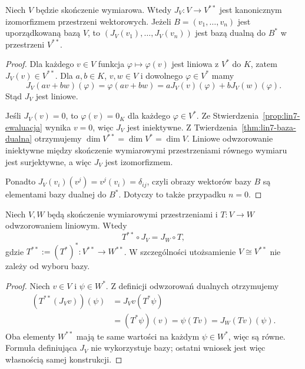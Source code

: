 \begin{twierdzenie}
\label{thm:lin7-bidualnosc}
Niech \(V\) będzie skończenie wymiarowa.
Wtedy \(J_V\colon V\to V^{**}\)
jest kanonicznym izomorfizmem
przestrzeni wektorowych.
Jeżeli \(B=(v_1,\ldots,v_n)\)
jest uporządkowaną bazą \(V\),
to \((J_V(v_1),\ldots,J_V(v_n))\)
jest bazą dualną do \(B^*\)
w przestrzeni \(V^{**}\).
\end{twierdzenie}
\begin{proof}
Dla każdego \(v\in V\)
funkcja \(\varphi\mapsto\varphi(v)\)
jest liniowa z \(V^*\) do \(K\),
zatem \(J_V(v)\in V^{**}\).
Dla \(a,b\in K\), \(v,w\in V\)
i dowolnego \(\varphi\in V^*\)
mamy
\[
 J_V(av+bw)(\varphi)
 =\varphi(av+bw)
 =aJ_V(v)(\varphi)
  +bJ_V(w)(\varphi).
\]
Stąd \(J_V\) jest liniowe.

Jeśli \(J_V(v)=0\), to
\(\varphi(v)=0_K\) dla każdego
\(\varphi\in V^*\).
Ze
Stwierdzenia~\ref{prop:lin7-ewaluacja}
wynika \(v=0\), więc \(J_V\)
jest iniektywne.
Z Twierdzenia~\ref{thm:lin7-baza-dualna}
otrzymujemy
\(\dim V^{**}=\dim V^*=\dim V\).
Liniowe odwzorowanie iniektywne
między skończenie wymiarowymi
przestrzeniami równego wymiaru
jest surjektywne, a więc \(J_V\)
jest izomorfizmem.

Ponadto
\(J_V(v_i)(v^j)=v^j(v_i)=\delta_{ij}\),
czyli obrazy wektorów bazy \(B\)
są elementami bazy dualnej
do \(B^*\). Dotyczy to także
przypadku \(n=0\).
\end{proof}

\begin{twierdzenie}
\label{thm:lin7-naturalnosc-bidualu}
Niech \(V,W\) będą skończenie
wymiarowymi przestrzeniami
i \(T\colon V\to W\) odwzorowaniem
liniowym. Wtedy
\[
 T^{**}\circ J_V=J_W\circ T,
\]
gdzie \(T^{**}:=(T^*)^*
\colon V^{**}\to W^{**}\).
W szczególności utożsamienie
\(V\cong V^{**}\) nie zależy
od wyboru bazy.
\end{twierdzenie}
\begin{proof}
Niech \(v\in V\) i \(\psi\in W^*\).
Z definicji odwzorowań dualnych
otrzymujemy
\[
 \begin{aligned}
 (T^{**}(J_Vv))(\psi)
 &=J_Vv(T^*\psi)\\
 &=(T^*\psi)(v)
 =\psi(Tv)
 =J_W(Tv)(\psi).
 \end{aligned}
\]
Oba elementy \(W^{**}\) mają
te same wartości na każdym
\(\psi\in W^*\), więc są równe.
Formuła definiująca \(J_V\)
nie wykorzystuje bazy;
ostatni wniosek jest więc
własnością samej konstrukcji.
\end{proof}

